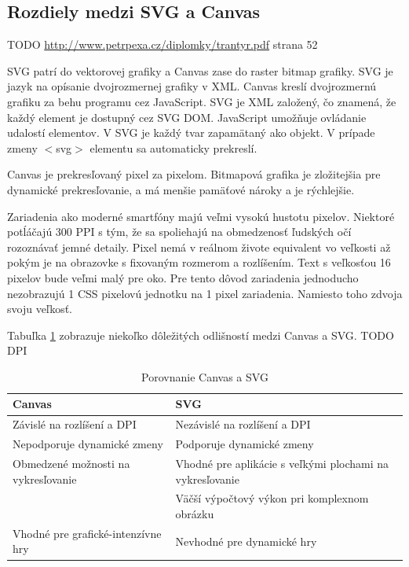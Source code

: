  \subsection{Rozdiely medzi SVG a Canvas}
TODO \url{http://www.petrpexa.cz/diplomky/trantyr.pdf} strana 52

SVG patrí do vektorovej grafiky a Canvas zase do raster bitmap grafiky. 
 SVG je jazyk na opísanie dvojrozmernej grafiky v XML.  Canvas kreslí dvojrozmernú grafiku za behu programu cez JavaScript.  SVG je XML založený, čo znamená, že každý element je dostupný cez SVG DOM.   JavaScript umožňuje ovládanie udalostí elementov. V SVG je každý tvar zapamätaný ako objekt.  V prípade zmeny $<$svg$>$ elementu sa automaticky prekreslí.  
 
 
 Canvas je prekresľovaný pixel za pixelom. Bitmapová grafika je zložitejšia pre dynamické prekresľovanie, a má menšie pamäťové nároky a je rýchlejšie. 

Zariadenia ako moderné smartfóny majú veľmi vysokú hustotu pixelov. Niektoré potĺáčajú 300 \ac{PPI} s tým, že sa spoliehajú na obmedzenosť ľudských očí rozoznávať jemné detaily. Pixel nemá v reálnom živote equivalent vo veľkosti až pokým je na obrazovke s fixovaným rozmerom a rozlíšením. Text s veľkosťou 16 pixelov bude veľmi malý pre oko. Pre tento dôvod zariadenia jednoducho nezobrazujú 1 CSS pixelovú jednotku na 1 pixel zariadenia. Namiesto toho zdvoja svoju veľkosť.  



 Tabuľka \ref{canvas:SVG} zobrazuje niekoľko dôležitých odlišností medzi Canvas a SVG. 
 TODO DPI
 \begin{table}[hp]
 \centering
 \begin{tabular}{|l|p{7.5cm} |}
 	\hline \textbf{Canvas} & \textbf{SVG} \\
 	 	\hline Závislé na rozlíšení a \acs{DPI} & Nezávislé na rozlíšení a DPI \\ 
 	\hline Nepodporuje dynamické zmeny & Podporuje dynamické zmeny \\ 
 	\hline Obmedzené možnosti na vykresľovanie  & Vhodné pre aplikácie s veľkými plochami na vykresľovanie \\ 
 	\hline & Väčší výpočtový výkon pri komplexnom obrázku \\ 
 	\hline Vhodné pre grafické-intenzívne hry & Nevhodné pre dynamické hry \\ 
 	\hline 
 \end{tabular} 

 \caption{Porovnanie Canvas a SVG}
 \label{canvas:SVG}
 
\end{table}
 
